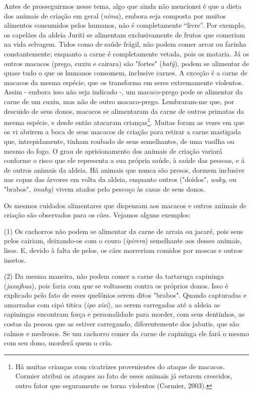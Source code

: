 Antes de prosseguirmos nesse tema, algo que ainda não mencionei é que a
dieta dos animais de criação em geral (\emph{nima}), embora seja
composta por muitos alimentos consumidos pelos humanos, não é
completamente ``livre''. Por exemplo, os capelães da aldeia Juriti se
alimentam exclusivamente de frutos que comeriam na vida selvagem. Tidos
como de saúde frágil, não podem comer arroz ou farinha constantemente;
enquanto a carne é completamente vetada, pois os mataria. Já os outros
macacos (prego, cuxiu e cairara) são "fortes" (\emph{hatỹ}), podem se
alimentar de quase tudo o que os humanos consomem, inclusive carnes. A
exceção é a carne de macacos da mesma espécie, que os transforma em
seres extremamente violentos. Assim - embora isso não seja indicado -,
um macaco-prego pode se alimentar da carne de um cuxiu, mas não de outro
macaco-prego. Lembraram-me que, por descuido de seus donos, macacos se
alimentaram da carne de outros primatas da mesma espécie, e desde então
atacaram crianças\footnote{Há muitas crianças com cicatrizes
  provenientes do ataque de macacos. Cormier atribui os ataques ao fato
  de esses animais já estarem crescidos, outro fator que seguramente os
  torna violentos (Cormier, 2003).}. Muitas foram as vezes em que os vi
abrirem a boca de seus macacos de criação para retirar a carne mastigada
que, intrepidamente, tinham roubado de seus semelhantes, de uma vasilha
ou mesmo do fogo. O grau de aprisionamento dos animais de criação
variará conforme o risco que ele representa a sua própria saúde, à saúde
das pessoas, e à de outros animais da aldeia. Há animais que nunca são
presos, dormem inclusive nas copas das árvores em volta da aldeia,
enquanto outros ("doidos", \emph{waky}, ou "brabos", \emph{imahy}) vivem
atados pelo pescoço às casas de seus donos.

Os mesmos cuidados alimentares que dispensam aos macacos e outros
animais de criação são observados para os cães. Vejamos alguns exemplos:

(1) Os cachorros não podem se alimentar da carne de arraia ou jacaré,
pois seus pelos cairiam, deixando-os com o couro (\emph{ipirera})
semelhante aos desses animais, lisos. E, devido à falta de pelos, os
cães morreriam comidos por moscas e outros insetos.

(2) Da mesma maneira, não podem comer a carne da tartaruga capininga
(\emph{jaxajhua}), pois faria com que se voltassem contra os próprios
donos. Isso é explicado pelo fato de esses quelônios serem ditos
"brabos". Quando capturadas e amarradas com cipó titica (\emph{ipo}
\emph{xixi}), ao serem carregadas até a aldeia as capiningas encontram
força e personalidade para morder, com seus dentinhos, as costas da
pessoa que as estiver carregando, diferentemente dos jabutis, que são
calmos e medrosos. Se um cachorro comer da carne de capininga ele fará o
mesmo com seu dono, morderá quem o cria.

